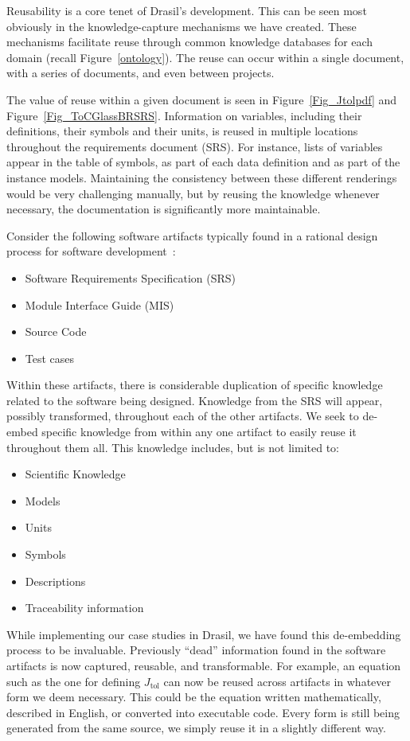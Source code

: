 \documentclass[sigconf]{acmart}
\newcommand{\jtol}{$J_{\mbox{tol}}$}
\begin{document}
{Reusability is a core tenet of Drasil's development. This can be seen most
obviously in the knowledge-capture mechanisms we have created. These mechanisms
facilitate reuse through common knowledge databases for each domain (recall
Figure~\ref{ontology}).  The reuse can occur within a single document, with a
series of documents, and even between projects.

The value of reuse within a given document is seen in Figure~\ref{Fig_Jtolpdf}
and Figure~\ref{Fig_ToCGlassBRSRS}.  Information on variables, including their
definitions, their symbols and their units, is reused in multiple locations
throughout the requirements document (SRS).  For instance, lists of variables
appear in the table of symbols, as part of each data definition and as part of
the instance models.  Maintaining the consistency between these different
renderings would be very challenging manually, but by reusing the knowledge
whenever necessary, the documentation is significantly more maintainable.

Consider the following software artifacts typically found in a rational design 
process for software development~\cite{ParnasAndClements1986}:

\begin{itemize}
\item Software Requirements Specification (SRS)
\item Module Interface Guide (MIS)
\item Source Code
\item Test cases
\end{itemize}

Within these artifacts, there is considerable duplication of specific knowledge 
related to the software being designed. Knowledge from the SRS will appear, 
possibly transformed, throughout each of the other artifacts. We seek to 
de-embed specific knowledge from within any one artifact to easily reuse 
it throughout them all. This knowledge includes, but is not limited to:

\begin{itemize}
\item Scientific Knowledge
\item Models
\item Units
\item Symbols
\item Descriptions
\item Traceability information
\end{itemize}

While implementing our case studies in Drasil, we have found this de-embedding 
process to be invaluable. Previously ``dead'' information found in the software 
artifacts is now captured, reusable, and transformable. For example, an equation 
such as the one for defining \jtol{} can now be reused across artifacts in 
whatever form we deem necessary. This could be the equation written 
mathematically, described in English, or converted into executable code. Every 
form is still being generated from the same source, we simply reuse it in a 
slightly different way.

}
\end{document}

